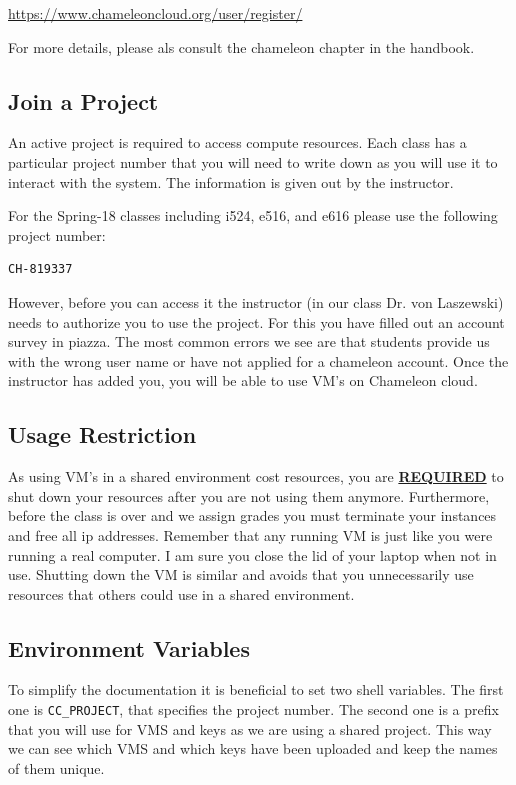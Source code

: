 \url{https://www.chameleoncloud.org/user/register/}

For more details, please als consult the chameleon chapter in the
handbook.

\subsection{Join a Project}

An active project is required to access compute resources.  Each class
has a particular project number that you will need to write down as
you will use it to interact with the system. The information is
given out by the instructor. 

For the Spring-18 classes including i524, e516, and e616 please use
the following project number:

\begin{lstlisting}
CH-819337
\end{lstlisting}

However, before you can access it the instructor (in our class Dr. von
Laszewski) needs to authorize you to use the project. For this you
have filled out an account survey in piazza. The most common errors we
see are that students provide us with the wrong user name or have not
applied for a chameleon account. Once the instructor has added you,
you will be able to use VM's on Chameleon cloud. 

\subsection{Usage Restriction}

As using VM's in a shared environment cost resources, you are
{\underline\bf REQUIRED} to shut down your resources after you are not
using them anymore. Furthermore, before the class is over and we
assign grades you must terminate your instances and free all ip
addresses. Remember that any running VM is just like you were running
a real computer. I am sure you close the lid of your laptop when not
in use. Shutting down the VM is similar and avoids that you
unnecessarily use resources that others could use in a shared
environment.

\subsection{Environment Variables}

To simplify the documentation it is beneficial to set two shell
variables. The first one is \verb|CC_PROJECT|, that specifies the project
number. The second one is a prefix that you will use for VMS and keys
as we are using a shared project. This way we can see which VMS and
which keys have been uploaded and keep the names of them unique.

